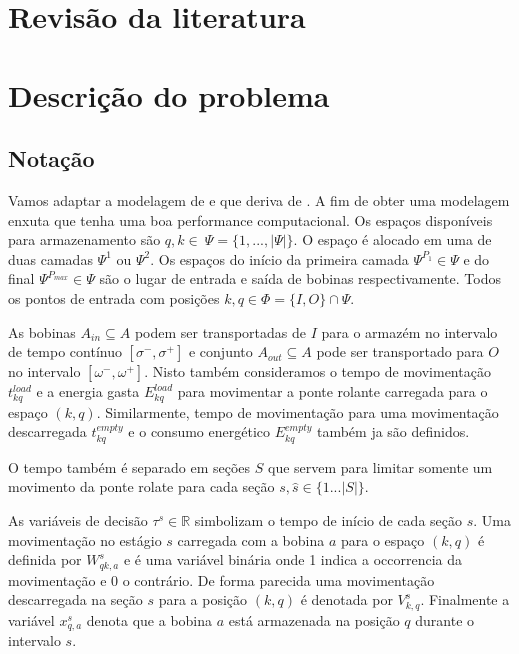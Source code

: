 \documentclass[journal]{IEEEtran}
\begin{document}
    \section{Revisão da literatura}
        
    \section{Descrição do problema}
        \subsection{Notação}
        Vamos adaptar a modelagem de \cite{Weckenborg2025} e que deriva de
        \cite{YUAN2017424}. A fim de obter uma modelagem enxuta que tenha uma
        boa performance computacional. Os espaços disponíveis para armazenamento
        são $q,k\in\ \Psi=\{1,...,|\Psi|\}$. O espaço é alocado em uma de duas 
        camadas $\Psi^1$ ou $\Psi^2$. Os espaços do início da primeira camada
        $\Psi^{P_1}\in\Psi$ e do final $\Psi^{P_{max}}\in\Psi$ são o lugar de 
        entrada e saída de bobinas respectivamente. Todos os pontos de entrada 
        com posições $k,q\in\Phi=\{I,O\}\cap\Psi$.
    
        As bobinas $A_{in}\subseteq{A}$ podem ser transportadas de $I$ para o 
        armazém no intervalo de tempo contínuo $[\sigma^-, \sigma^+]$ e
        conjunto $A_{out}\subseteq{A}$ pode ser transportado para $O$ no intervalo
        $[\omega^-,\omega^+]$. Nisto também consideramos o tempo de movimentação
        $t^{load}_{kq}$ e a energia gasta $E^{load}_{kq}$ para movimentar a ponte
        rolante carregada para o espaço $(k,q)$. Similarmente, tempo de movimentação
        para uma movimentação descarregada $t^{empty}_{kq}$ e o consumo energético 
        $E^{empty}_{kq}$ também ja são definidos. 

        O tempo também é separado em seções $S$ que servem para limitar somente 
        um movimento da ponte rolate para cada seção $s,\hat{s}\in\{1...|S|\}$.

        As variáveis de decisão $\tau^s\in\mathbb{R}$ simbolizam o tempo de 
        início de cada seção $s$. Uma movimentação no estágio $s$ carregada com 
        a bobina $a$ para o espaço $(k,q)$ é definida por $W^{s}_{qk,a}$ e é uma 
        variável binária onde 1 indica a occorrencia da movimentação e 0 o 
        contrário. De forma parecida uma movimentação descarregada na seção $s$
        para a posição $(k,q)$ é denotada por $V^{s}_{k,q}$. Finalmente a variável 
        $x^{s}_{q,a}$ denota que a bobina $a$ está armazenada na posição $q$ 
        durante o intervalo $s$. 
\end{document}
